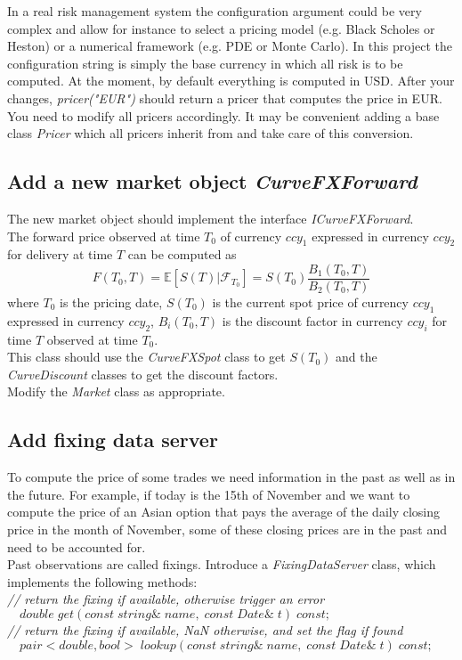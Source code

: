 \documentclass[10pt]{article}
\begin{document}
In a real risk management system the configuration argument could be very complex and allow for instance to select a pricing model (e.g. Black Scholes or Heston) or a numerical framework (e.g. PDE or Monte Carlo). In this project the configuration string is simply the base currency in which all risk is to be computed. At the moment, by default everything is computed in USD. After your changes, \textit{pricer("EUR")} should return a pricer that computes the price in EUR.\\

You need to modify all pricers accordingly. It may be convenient adding a base class \textit{Pricer} which all pricers inherit from and take care of this conversion.

\subsection{Add a new market object \textit{CurveFXForward}}
The new market object should implement the interface \textit{ICurveFXForward}.\\

The forward price observed at time $T_0$ of currency $ccy_1$ expressed in currency $ccy_2$ for delivery at time $T$ can be computed as
$$F(T_0,T)=\mathbb{E}[S(T)|\mathcal{F}_{T_0}]=S(T_0) \frac{B_1(T_0,T)}{B_2(T_0,T)}$$
where $T_0$ is the pricing date, $S(T_0)$ is the current spot price of currency $ccy_1$ expressed in currency $ccy_2$, $B_i(T_0,T)$ is the discount factor in currency $ccy_i$ for time $T$ observed at time $T_0$.\\

This class should use the \textit{CurveFXSpot} class to get $S(T_0)$ and the \textit{CurveDiscount} classes to get the discount factors.\\

Modify the \textit{Market} class as appropriate.

\subsection{Add fixing data server}
To compute the price of some trades we need information in the past as well as in the future. For example, if today is the 15th of November and we want to compute the price of an Asian option that pays the average of the daily closing price in the month of November, some of these closing prices are in the past and need to be accounted for.\\

Past observations are called fixings. Introduce a \textit{FixingDataServer} class, which implements the following methods:\\
\textit{// return the fixing if available, otherwise trigger an error}\\
$\quad double\; get(const\; string\&\; name,\; const\; Date\&\; t)\; const;$\\
\textit{// return the fixing if available, NaN otherwise, and set the flag if found}\\
$\quad pair<double, bool>\; lookup(const\; string\&\; name,\; const\; Date\&\; t)\; const;$\\
\end{document}
